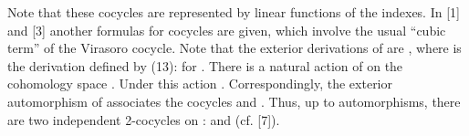 \documentclass[a4paper,a4paper]{article}
\begin{document}
Note that these cocycles are represented by linear functions of the indexes.
In [1] and  [3] another formulas for cocycles are given, which involve
the usual ``cubic term'' of the Virasoro cocycle.
Note that the exterior derivations of \coordHE{} are
\coordHE{}, where \coordHE{} is the derivation
defined by (13):
\coordHE{} for \coordHE{}.
There is a natural action of \coordHE{} on
the cohomology space \coordHE{}. Under this action 
\coordHE{}.
Correspondingly, the exterior automorphism \coordHE{} of \coordHE{} 
associates the cocycles \coordHE{} and \coordHE{}.
Thus, up to automorphisms, there are two independent 2-cocycles 
on \coordHE{}: \coordHE{} and \coordHE{} (cf. [7]).
\end{document}
